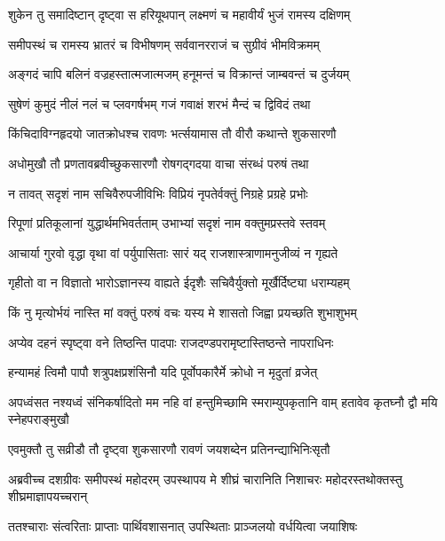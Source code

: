 
\twolineshloka
{शुकेन तु समादिष्टान् दृष्ट्वा स हरियूथपान्}
{लक्ष्मणं च महावीर्यं भुजं रामस्य दक्षिणम्} %

\twolineshloka
{समीपस्थं च रामस्य भ्रातरं च विभीषणम्}
{सर्ववानरराजं च सुग्रीवं भीमविक्रमम्} %

\twolineshloka
{अङ्गदं चापि बलिनं वज्रहस्तात्मजात्मजम्}
{हनूमन्तं च विक्रान्तं जाम्बवन्तं च दुर्जयम्} %

\twolineshloka
{सुषेणं कुमुदं नीलं नलं च प्लवगर्षभम्}
{गजं गवाक्षं शरभं मैन्दं च द्विविदं तथा} %

\twolineshloka
{किंचिदाविग्नहृदयो जातक्रोधश्च रावणः}
{भर्त्सयामास तौ वीरौ कथान्ते शुकसारणौ} %

\twolineshloka
{अधोमुखौ तौ प्रणतावब्रवीच्छुकसारणौ}
{रोषगद्गदया वाचा संरब्धं परुषं तथा} %

\twolineshloka
{न तावत् सदृशं नाम सचिवैरुपजीविभिः}
{विप्रियं नृपतेर्वक्तुं निग्रहे प्रग्रहे प्रभोः} %

\twolineshloka
{रिपूणां प्रतिकूलानां युद्धार्थमभिवर्तताम्}
{उभाभ्यां सदृशं नाम वक्तुमप्रस्तवे स्तवम्} %

\twolineshloka
{आचार्या गुरवो वृद्धा वृथा वां पर्युपासिताः}
{सारं यद् राजशास्त्राणामनुजीव्यं न गृह्यते} %

\twolineshloka
{गृहीतो वा न विज्ञातो भारोऽज्ञानस्य वाह्यते}
{ईदृशैः सचिवैर्युक्तो मूर्खैर्दिष्ट्या धराम्यहम्} %

\twolineshloka
{किं नु मृत्योर्भयं नास्ति मां वक्तुं परुषं वचः}
{यस्य मे शासतो जिह्वा प्रयच्छति शुभाशुभम्} %

\twolineshloka
{अप्येव दहनं स्पृष्ट्वा वने तिष्ठन्ति पादपाः}
{राजदण्डपरामृष्टास्तिष्ठन्ते नापराधिनः} %

\twolineshloka
{हन्यामहं त्विमौ पापौ शत्रुपक्षप्रशंसिनौ}
{यदि पूर्वोपकारैर्मे क्रोधो न मृदुतां व्रजेत्} %

\threelineshloka
{अपध्वंसत नश्यध्वं संनिकर्षादितो मम}
{नहि वां हन्तुमिच्छामि स्मराम्युपकृतानि वाम्}
{हतावेव कृतघ्नौ द्वौ मयि स्नेहपराङ्मुखौ} %

\twolineshloka
{एवमुक्तौ तु सव्रीडौ तौ दृष्ट्वा शुकसारणौ}
{रावणं जयशब्देन प्रतिनन्द्याभिनिःसृतौ} %

\threelineshloka
{अब्रवीच्च दशग्रीवः समीपस्थं महोदरम्}
{उपस्थापय मे शीघ्रं चारानिति निशाचरः}
{महोदरस्तथोक्तस्तु शीघ्रमाज्ञापयच्चरान्} %

\twolineshloka
{ततश्चाराः संत्वरिताः प्राप्ताः पार्थिवशासनात्}
{उपस्थिताः प्राञ्जलयो वर्धयित्वा जयाशिषः} %

